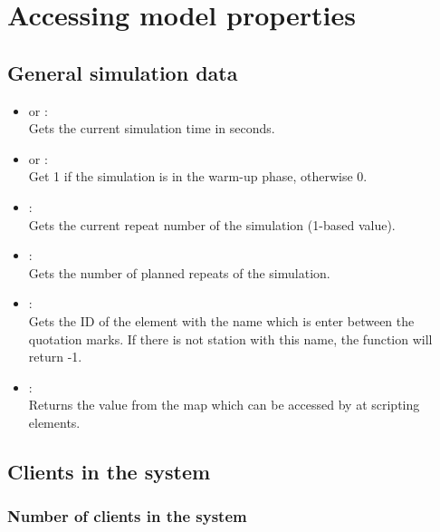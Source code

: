 \chapter{Accessing model properties}



\section{General simulation data}

\begin{itemize}

\item
{} or :\\
Gets the current simulation time in seconds.

\item
{} or :\\
Get 1 if the simulation is in the warm-up phase, otherwise 0.

\item
{}:\\
Gets the current repeat number of the simulation (1-based value).

\item
{}:\\
Gets the number of planned repeats of the simulation.

\item
{}:\\
Gets the ID of the element with the name which is enter between the quotation marks.
If there is not station with this name, the function will return -1.

\item
{}:\\
Returns the value from the map which can be accessed by  at scripting elements.

\end{itemize}





\section{Clients in the system}



\subsection{Number of clients in the system}


